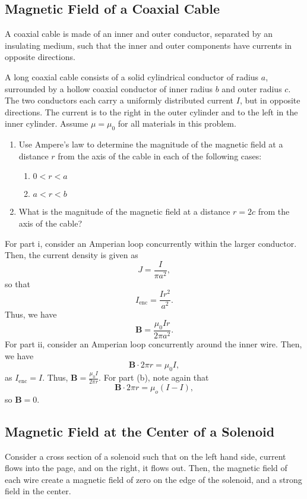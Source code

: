 \documentclass[11pt]{article}
\begin{document}
\subsection{Magnetic Field of a Coaxial Cable}
A coaxial cable is made of an inner and outer conductor, separated by an insulating medium, such that the inner and outer components have currents in opposite directions.
\begin{example}[1994 E3]
    A long coaxial cable consists of a solid cylindrical conductor of radius $a$, surrounded by a hollow coaxial conductor of inner radius $b$ and outer radius $c$. The two conductors each carry a uniformly distributed current $I$, but in opposite directions. The current is to the right in the outer cylinder and to the left in the inner cylinder. Assume $\mu = \mu_0$ for all materials in this problem.
    \begin{enumerate}[label=\alph*.]
        \item Use Ampere's law to determine the magnitude of the magnetic field at a distance $r$ from the axis of the cable in each of the following cases:
        \begin{enumerate}[label=\roman*.]
            \item $0 < r < a$
            \item $a < r < b$
        \end{enumerate}
        \item What is the magnitude of the magnetic field at a distance $r = 2c$ from the axis of the cable?
    \end{enumerate}
\end{example}
\begin{solution}
    For part i, consider an Amperian loop concurrently within the larger conductor. Then, the current density is given as
    \[J = \frac{I}{\pi a^2},\]
    so that
    \[I_{\mathrm{enc}} = \frac{Ir^2}{a^2}.\]
    Thus, we have
    \[\mathbf{B} = \frac{\mu_0 I r}{2\pi a^2}.\]
    For part ii, consider an Amperian loop concurrently around the inner wire. Then, we have
    \[\mathbf{B} \cdot 2\pi r = \mu_0 I,\]
    as $I_{\mathrm{enc}} = I$. Thus, $\mathbf{B} = \frac{\mu_0 I}{2\pi r}.$ For part (b), note again that
    \[\mathbf{B} \cdot 2\pi r = \mu_o (I - I),\]
    so $\mathbf{B} = 0$.
\end{solution}

\subsection{Magnetic Field at the Center of a Solenoid}
Consider a cross section of a solenoid such that on the left hand side, current flows into the page, and on the right, it flows out. Then, the magnetic field of each wire create a magnetic field of zero on the edge of the solenoid, and a strong field in the center.
\end{document}

